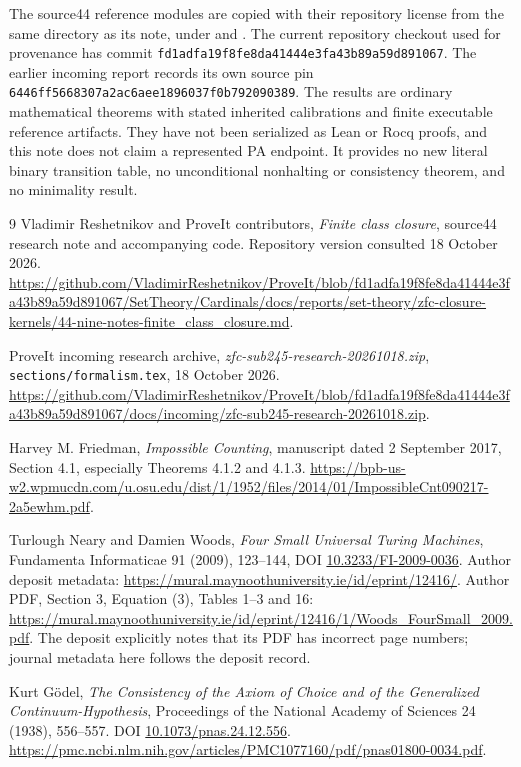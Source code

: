 \documentclass[11pt]{article}
\begin{document}
The source44 reference modules are copied with their repository license
from the same directory as its note, under
 and
. The current repository
checkout used for provenance has commit
\nolinkurl{fd1adfa19f8fe8da41444e3fa43b89a59d891067}. The earlier incoming
report records its own source pin
\nolinkurl{6446ff5668307a2ac6aee1896037f0b792090389}.
The results are ordinary mathematical theorems with stated inherited
calibrations and finite executable reference artifacts. They have not been
serialized as Lean or Rocq proofs, and this note does not claim a represented
PA endpoint. It provides no new literal binary transition table, no
unconditional nonhalting or consistency theorem, and no minimality result.
\begin{thebibliography}{9}
Vladimir Reshetnikov and ProveIt contributors,
\emph{Finite class closure}, source44 research note and accompanying code.
Repository version consulted 18 October 2026.
\url{https://github.com/VladimirReshetnikov/ProveIt/blob/fd1adfa19f8fe8da41444e3fa43b89a59d891067/SetTheory/Cardinals/docs/reports/set-theory/zfc-closure-kernels/44-nine-notes-finite_class_closure.md}.

ProveIt incoming research archive,
\emph{zfc-sub245-research-20261018.zip},
\texttt{sections/formalism.tex}, 18 October 2026.
\url{https://github.com/VladimirReshetnikov/ProveIt/blob/fd1adfa19f8fe8da41444e3fa43b89a59d891067/docs/incoming/zfc-sub245-research-20261018.zip}.

Harvey M. Friedman,
\emph{Impossible Counting}, manuscript dated 2 September 2017,
Section 4.1, especially Theorems 4.1.2 and 4.1.3.
\url{https://bpb-us-w2.wpmucdn.com/u.osu.edu/dist/1/1952/files/2014/01/ImpossibleCnt090217-2a5ewhm.pdf}.

Turlough Neary and Damien Woods,
\emph{Four Small Universal Turing Machines},
Fundamenta Informaticae 91 (2009), 123--144,
DOI \href{https://doi.org/10.3233/FI-2009-0036}{10.3233/FI-2009-0036}.
Author deposit metadata:
\url{https://mural.maynoothuniversity.ie/id/eprint/12416/}.
Author PDF, Section 3, Equation (3), Tables 1--3 and 16:
\url{https://mural.maynoothuniversity.ie/id/eprint/12416/1/Woods_FourSmall_2009.pdf}.
The deposit explicitly notes that its PDF has incorrect page numbers;
journal metadata here follows the deposit record.

Kurt G\"odel,
\emph{The Consistency of the Axiom of Choice and of the Generalized
Continuum-Hypothesis}, Proceedings of the National Academy of Sciences
24 (1938), 556--557.
DOI \href{https://doi.org/10.1073/pnas.24.12.556}{10.1073/pnas.24.12.556}.
\url{https://pmc.ncbi.nlm.nih.gov/articles/PMC1077160/pdf/pnas01800-0034.pdf}.
\end{thebibliography}
\end{document}
